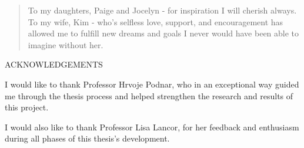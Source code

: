 \documentclass[12pt]{report}
\newenvironment{dedication}
	{\vspace{6ex}\begin{quotation}\begin{center}\begin{em}}
	{\par\end{em}\end{center}\end{quotation}}
\begin{document}
\begin{dedication}
\setcounter{page}{4}
\vspace*{\fill}
To my daughters, Paige and Jocelyn - for inspiration I will cherish always.
\linebreak\linebreak
To my wife, Kim - who’s selfless love, support, and encouragement has allowed me to fulfill new dreams and goals I never would have been able to imagine without her.
\vspace*{\fill}
\end{dedication}


\newpage
\thispagestyle{plain}
\setcounter{page}{5}
\vspace*{0in}
\begin{center}
\MakeTextUppercase{\large{Acknowledgements}} \\
\end{center}

I would like to thank Professor Hrvoje Podnar, who  in an exceptional way guided me through the thesis process and helped strengthen the research and results of this project.

I would also like to thank Professor Lisa Lancor, for her feedback and enthusiasm during all phases of this thesis's development.

\newpage


\tableofcontents
\listoffigures



\end{document}
